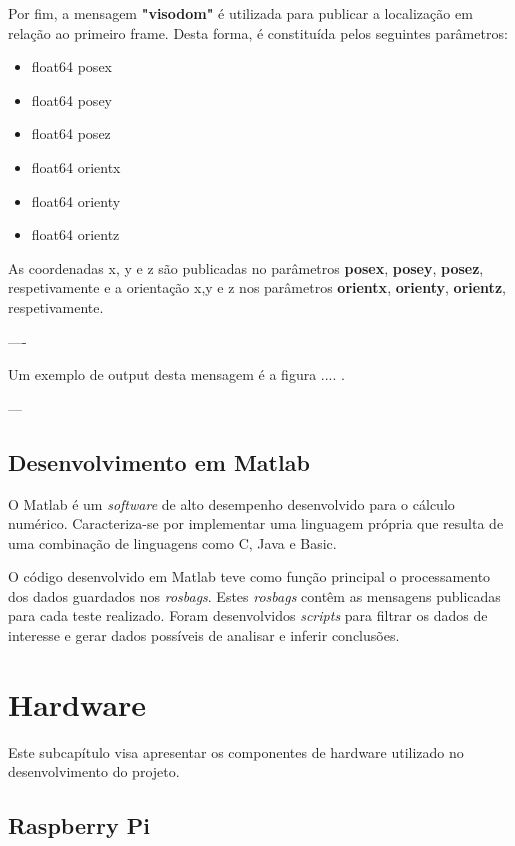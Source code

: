 	
	Por fim, a mensagem \textbf{"visodom"} é utilizada para publicar a localização em relação ao primeiro frame. Desta forma, é constituída pelos seguintes parâmetros:
	
	\begin{itemize}
	
		\item float64 posex
		\item float64 posey
		\item float64 posez
	
		\item float64 orientx
		\item float64 orienty
		\item float64 orientz
	
	\end{itemize}

	As coordenadas x, y e z são publicadas no parâmetros \textbf{posex}, \textbf{posey}, \textbf{posez}, respetivamente e a orientação x,y e z nos parâmetros \textbf{orientx}, \textbf{orienty}, \textbf{orientz}, respetivamente. 
	
	
	----
	
	Um exemplo de output desta mensagem é a figura .... .
	
	---
	
	

\subsection{Desenvolvimento em Matlab}

O Matlab é um \textit{software} de alto desempenho desenvolvido para o cálculo numérico. Caracteriza-se por implementar uma linguagem própria que resulta de uma combinação de linguagens como C, Java e Basic.

O código desenvolvido em Matlab teve como função principal o processamento dos dados guardados nos \textit{rosbags}. Estes \textit{rosbags} contêm as mensagens publicadas para cada teste realizado. Foram desenvolvidos \textit{scripts} para filtrar os dados de interesse e gerar dados possíveis de analisar e inferir conclusões.


\section{Hardware}

Este subcapítulo visa apresentar os componentes de hardware utilizado no desenvolvimento do projeto.

\subsection{Raspberry Pi}

